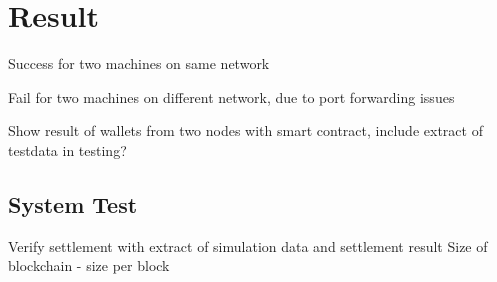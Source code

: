 \chapter{Result}
Success for two machines on same network

Fail for two machines on different network, due to port forwarding issues

Show result of wallets from two nodes with smart contract, include extract of testdata in testing?

\section{System Test}
Verify settlement with extract of simulation data and settlement result
Size of blockchain - size per block
